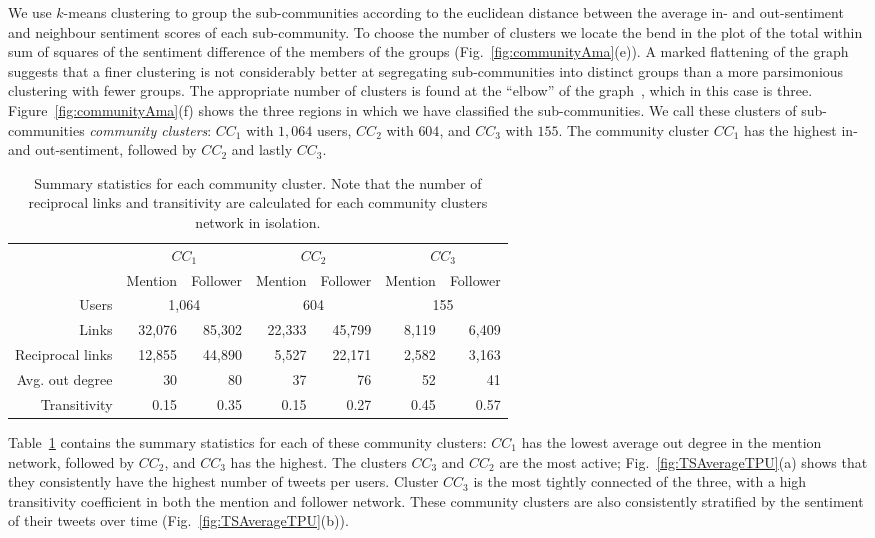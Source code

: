 \documentclass{article}
\begin{document}
We use $k$-means clustering to group the sub-communities according to
the euclidean distance between the average in- and out-sentiment and
neighbour sentiment scores of each sub-community. To choose the number
of clusters we locate the bend in the plot of the total within sum of
squares of the sentiment difference of the members of the groups
(Fig.~\ref{fig:communityAma}(e)).  A marked flattening of the graph
suggests that a finer clustering is not considerably better at
segregating sub-communities into distinct groups than a more
parsimonious clustering with fewer groups. The appropriate number of
clusters is found at the ``elbow'' of the
graph~\cite{Aggarwal2013Clustering}, which in this case is three.
Figure~\ref{fig:communityAma}(f) shows the three regions in which we
have classified the sub-communities. We call these clusters of
sub-communities {\it community clusters}: $CC_1$ with $1,064$ users,
$CC_2$ with $604$, and $CC_3$ with $155$. The community cluster $CC_1$
has the highest in- and out-sentiment, followed by $CC_2$ and lastly
$CC_3$.

\begin{table}[tp]
\centering
\begin{tabular}{r|rr|rr|rr}
  \multicolumn{1}{c|}{} & \multicolumn{2}{c|}{$CC_1$}
  & \multicolumn{2}{c|}{$CC_2$} & \multicolumn{2}{c}{$CC_3$} \\
& Mention & Follower & Mention & Follower & Mention & Follower  \\ \hline
Users & \multicolumn{2}{c|}{1,064} & \multicolumn{2}{c|}{604}
& \multicolumn{2}{c}{155}    \\
Links  & 32,076  & 85,302  & 22,333  & 45,799  & 8,119  & 6,409  \\
Reciprocal links & 12,855  & 44,890  & 5,527  & 22,171  & 2,582 & 3,163  \\
Avg. out degree  & 30 & 80 & 37 & 76 & 52 & 41  \\
Transitivity   & 0.15 & 0.35 & 0.15 & 0.27 & 0.45  & 0.57        
\end{tabular}
\caption{Summary statistics for each community cluster. Note that the
  number of reciprocal links and transitivity are calculated for each
  community clusters network in isolation.}\label{tab:summaryCC}
\end{table}


Table~\ref{tab:summaryCC} contains the summary statistics for each of
these community clusters: $CC_1$ has the lowest average out degree in
the mention network, followed by $CC_2$, and $CC_3$ has the
highest. The clusters $CC_3$ and $CC_2$ are the most active;
Fig.~\ref{fig:TSAverageTPU}(a) shows that they consistently have the
highest number of tweets per users. Cluster $CC_3$ is the most tightly
connected of the three, with a high transitivity
coefficient in both the mention and follower network. These community
clusters are also consistently stratified by the sentiment of their
tweets over time (Fig.~\ref{fig:TSAverageTPU}(b)).
\end{document}
